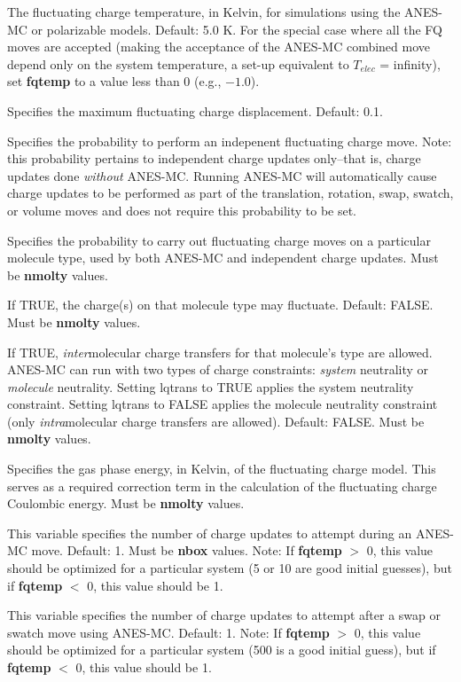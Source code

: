 \documentclass[12pt,letterpaper]{article}
\begin{document}
 The fluctuating charge temperature,
in Kelvin, for simulations using the ANES-MC or polarizable
models. Default: 5.0 K. For the special case where all the FQ moves 
are accepted (making the acceptance of the ANES-MC combined
move depend only on the system temperature, a set-up
equivalent to $T_{elec}$ = infinity), set {\bf fqtemp} to a value less than 
0 (e.g., $-1.0$).

 Specifies the maximum fluctuating
charge displacement. Default: 0.1.

 Specifies the probability to perform
an indepenent fluctuating charge move. Note: this probability pertains to
independent charge updates only--that is, charge updates done
{\sl without} ANES-MC. Running ANES-MC will automatically 
cause charge updates to be performed as part of the translation, 
rotation, swap, swatch, or volume moves and
does not require this probability to be set.

 Specifies the probability to
carry out fluctuating charge moves on a particular molecule type,
used by both ANES-MC and independent charge updates. 
Must be {\bf nmolty} values.

 If TRUE, the charge(s) on that
molecule type may fluctuate. Default: FALSE. 
Must be {\bf nmolty} values.

 If TRUE, {\sl inter}molecular charge
transfers for that molecule's type are allowed. ANES-MC can run with
two types of charge constraints: {\sl system} neutrality or {\sl molecule} neutrality.
Setting lqtrans to TRUE applies the system neutrality constraint. Setting
lqtrans to FALSE applies the molecule neutrality constraint (only 
{\sl intra}molecular charge transfers are allowed).
Default: FALSE.  Must be {\bf nmolty} values.

 Specifies the gas phase energy, in Kelvin, of the
fluctuating charge model. This serves as a required correction term in the
calculation of the fluctuating charge Coulombic energy. 
Must be {\bf nmolty} values.

 This variable specifies the number of
charge updates to attempt during an ANES-MC move. Default: 1. 
Must be {\bf nbox} values. 
Note: 
If {\bf fqtemp} $>$ 0, this value should be optimized for a particular system
(5 or 10 are good initial guesses), but if {\bf fqtemp} $<$ 0, this value 
should be 1.

 This variable specifies the number of
charge updates to attempt after a swap or swatch move using ANES-MC. 
Default: 1. Note: 
If {\bf fqtemp} $>$ 0, this value should be optimized for a particular system
(500 is a good initial guess), but if {\bf fqtemp} $<$ 0, this value 
should be 1.
\end{document}
